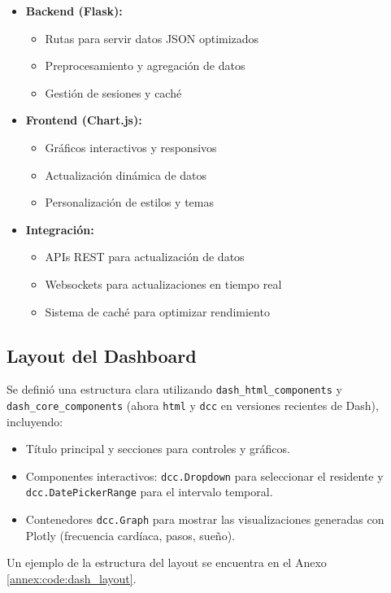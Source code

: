 \begin{itemize}
    \item \textbf{Backend (Flask):}
        \begin{itemize}
            \item Rutas para servir datos JSON optimizados
            \item Preprocesamiento y agregación de datos
            \item Gestión de sesiones y caché
        \end{itemize}
    \item \textbf{Frontend (Chart.js):}
        \begin{itemize}
            \item Gráficos interactivos y responsivos
            \item Actualización dinámica de datos
            \item Personalización de estilos y temas
        \end{itemize}
    \item \textbf{Integración:}
        \begin{itemize}
            \item APIs REST para actualización de datos
            \item Websockets para actualizaciones en tiempo real
            \item Sistema de caché para optimizar rendimiento
        \end{itemize}
\end{itemize}

\subsection{Layout del Dashboard}
Se definió una estructura clara utilizando \texttt{dash\_html\_components} y \texttt{dash\_core\_components} (ahora \texttt{html} y \texttt{dcc} en versiones recientes de Dash), incluyendo:
\begin{itemize}
    \item Título principal y secciones para controles y gráficos.
    \item Componentes interactivos: \texttt{dcc.Dropdown} para seleccionar el residente y \texttt{dcc.DatePickerRange} para el intervalo temporal.
    \item Contenedores \texttt{dcc.Graph} para mostrar las visualizaciones generadas con Plotly (frecuencia cardíaca, pasos, sueño).
\end{itemize}
Un ejemplo de la estructura del layout se encuentra en el Anexo \ref{annex:code:dash_layout}.

